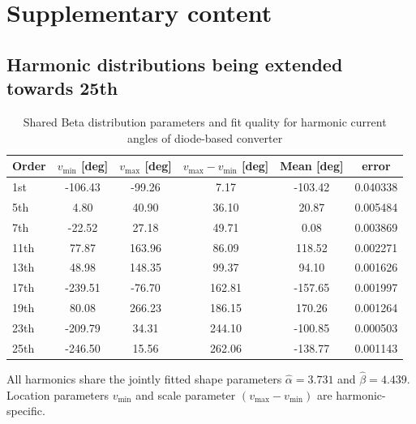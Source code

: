 \section{Supplementary content}
\label{sec:supplementary}


\subsection{Harmonic distributions being extended towards 25th} 

\begin{table}[!t]
    \centering
    \caption{Shared Beta distribution parameters and fit quality for harmonic current angles of diode-based converter}
    \label{tab:beta_phase_params_diode_to25}
    \scriptsize
    \setlength{\tabcolsep}{3pt}
    \begin{tabular}{l c c c c c}
    Order & $v_{\min}$ [deg] & $v_{\max}$ [deg] & $v_{\max}-v_{\min}$ [deg] & Mean [deg] & error \\
    \hline
    1st & -106.43 & -99.26 & 7.17 & -103.42 & 0.040338 \\
    5th & 4.80 & 40.90 & 36.10 & 20.87 & 0.005484 \\
    7th & -22.52 & 27.18 & 49.71 & 0.08 & 0.003869 \\
    11th & 77.87 & 163.96 & 86.09 & 118.52 & 0.002271 \\
    13th & 48.98 & 148.35 & 99.37 & 94.10 & 0.001626 \\
    17th & -239.51 & -76.70 & 162.81 & -157.65 & 0.001997 \\
    19th & 80.08 & 266.23 & 186.15 & 170.26 & 0.001264 \\
    23th & -209.79 & 34.31 & 244.10 & -100.85 & 0.000503 \\
    25th & -246.50 & 15.56 & 262.06 & -138.77 & 0.001143 \\
    \end{tabular}
    \vspace{2pt}
    \parbox{\columnwidth}{\scriptsize All harmonics share the jointly fitted shape parameters $\hat{\alpha}=3.731$ and $\hat{\beta}=4.439$. \\
    Location parameters $v_{\min}$ and scale parameter $(v_{\max} - v_{\min})$ are harmonic-specific.}
\end{table}

